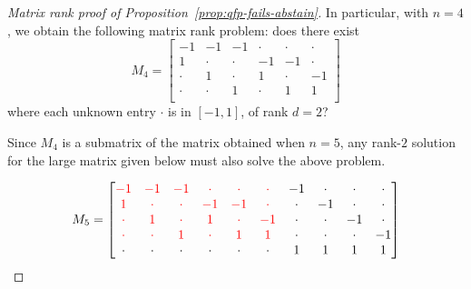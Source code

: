 \documentclass[final]{colt2020} %
\begin{document}
\begin{proof}[Matrix rank proof of Proposition~\ref{prop:qfp-fails-abstain}]
	In particular, with $n=4$, we obtain the following matrix rank problem: does there exist
	\[
	M_4 = 
	\begin{bmatrix}
	-1 & -1 & -1 & \cdot & \cdot & \cdot \\
	1 & \cdot & \cdot & -1 & -1 & \cdot \\
	\cdot & 1 & \cdot & 1 & \cdot & -1 \\
	\cdot & \cdot & 1 & \cdot & 1 & 1 \\
	\end{bmatrix}
	\]
	where each unknown entry $\cdot$ is in $[-1,1]$, of rank $d=2$?
	
	Since $M_4$ is a submatrix of the matrix obtained when $n=5$, any rank-$2$ solution for the large matrix given below must also solve the above problem.
	
	\[
	M_5 =
	\begin{bmatrix}
	{\color{red} -1} & {\color{red} -1} & {\color{red} -1} & {\color{red} \cdot} & {\color{red} \cdot} & {\color{red} \cdot} & -1 & \cdot & \cdot & \cdot \\
	{\color{red} 1} & {\color{red} \cdot} & {\color{red} \cdot} & {\color{red} -1} & {\color{red} -1} & {\color{red} \cdot} & \cdot & -1 & \cdot & \cdot \\
	{\color{red} \cdot} & {\color{red} 1} & {\color{red} \cdot} & {\color{red} 1} & {\color{red} \cdot} & {\color{red} -1} & \cdot & \cdot & -1 & \cdot \\
	{\color{red} \cdot} & {\color{red} \cdot} & {\color{red} 1} & {\color{red} \cdot} & {\color{red} 1} & {\color{red} 1} & \cdot & \cdot & \cdot & -1 \\
	\cdot & \cdot & \cdot & \cdot & \cdot & \cdot & 1 & 1 & 1 & 1\\
	\end{bmatrix}
	\]
	

\end{proof}
\end{document}

